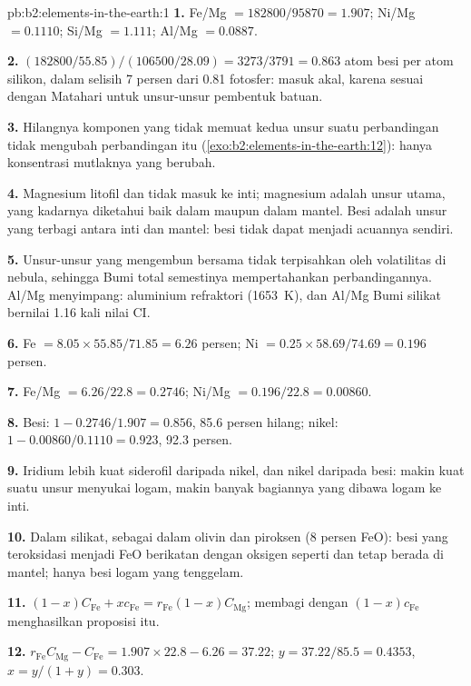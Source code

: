 \begin{solution}{pb:b2:elements-in-the-earth:1}
\textbf{1.} Fe/Mg $= \num{182800}/\num{95870} = 1.907$; Ni/Mg $= 0.1110$; Si/Mg $=
1.111$; Al/Mg $= 0.0887$.

\textbf{2.} $(\num{182800}/55.85)/(\num{106500}/28.09) = 3273/3791 = 0.863$ atom besi per
atom silikon, dalam selisih 7 persen dari 0.81 fotosfer: masuk akal, karena 
sesuai dengan Matahari untuk unsur-unsur pembentuk batuan.

\textbf{3.} Hilangnya komponen yang tidak memuat kedua unsur suatu perbandingan tidak mengubah
perbandingan itu (\cref{exo:b2:elements-in-the-earth:12}): hanya konsentrasi mutlaknya yang berubah.

\textbf{4.} Magnesium litofil dan tidak masuk ke inti; magnesium adalah unsur utama,
yang kadarnya diketahui baik dalam  maupun dalam mantel. Besi adalah unsur yang terbagi
antara inti dan mantel: besi tidak dapat menjadi acuannya sendiri.

\textbf{5.} Unsur-unsur yang mengembun bersama tidak terpisahkan oleh volatilitas di
nebula, sehingga Bumi total semestinya mempertahankan perbandingannya. Al/Mg menyimpang: aluminium
refraktori (\qty{1653}{K}), dan Al/Mg Bumi silikat bernilai 1.16 kali nilai CI.

\textbf{6.} Fe $= 8.05\times55.85/71.85 = 6.26$ persen; Ni $= 0.25\times58.69/74.69 =
0.196$ persen.

\textbf{7.} Fe/Mg $= 6.26/22.8 = 0.2746$; Ni/Mg $= 0.196/22.8 = 0.00860$.

\textbf{8.} Besi: $1 - 0.2746/1.907 = 0.856$, 85.6 persen hilang; nikel:
$1 - 0.00860/0.1110 = 0.923$, 92.3 persen.

\textbf{9.} Iridium lebih kuat siderofil daripada nikel, dan nikel daripada besi:
makin kuat suatu unsur menyukai logam, makin banyak bagiannya yang dibawa logam ke inti.

\textbf{10.} Dalam silikat, sebagai  dalam olivin dan piroksen (8 persen FeO):
besi yang teroksidasi menjadi FeO berikatan dengan oksigen seperti  dan tetap berada di
mantel; hanya besi logam yang tenggelam.

\textbf{11.} $(1-x)C_{\mathrm{Fe}} + xc_{\mathrm{Fe}} = r_{\mathrm{Fe}}(1-x)C_{\mathrm{Mg}}$;
membagi dengan $(1-x)c_{\mathrm{Fe}}$ menghasilkan proposisi itu.

\textbf{12.} $r_{\mathrm{Fe}}C_{\mathrm{Mg}} - C_{\mathrm{Fe}} = 1.907\times22.8 - 6.26 =
37.22$; $y = 37.22/85.5 = 0.4353$, $x = y/(1+y) = 0.303$.


\end{solution}
